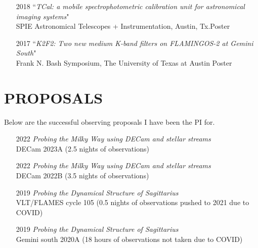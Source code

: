 \documentclass[11pt,letterpaper, sans]{moderncv}        %
\begin{document}
\begin{itemize} [itemsep=1pt, leftmargin=28pt]
\item[2018] ``\textit{TCal: a mobile spectrophotometric calibration unit for astronomical imaging systems}"\\
SPIE Astronomical Telescopes + Instrumentation, Austin, Tx.\hfill Poster

\item [2017] ``\textit{K2F2: Two new medium K-band filters on FLAMINGOS-2 at Gemini South}"\\
Frank N. Bash Symposium, The University of Texas at Austin \hfill Poster
\end{itemize}
\section{PROPOSALS}
Below are the successful observing proposals I have been the PI for.
\begin{itemize}[itemsep=1pt, leftmargin=28pt]
    \item [2022] \emph{Probing the Milky Way using DECam and stellar streams}\\ DECam 2023A (2.5 nights of observations)
    \item [2022] \emph{Probing the Milky Way using DECam and stellar streams}\\ DECam 2022B (3.5 nights of observations)
    \item [2019] \emph{Probing the Dynamical Structure of Sagittarius}\\ VLT/FLAMES cycle 105 (0.5 nights of observations pushed to 2021 due to COVID)
    \item [2019] \emph{Probing the Dynamical Structure of Sagittarius}\\ Gemini south 2020A (18 hours of observations not taken due to COVID)
\end{itemize}
\end{document}
